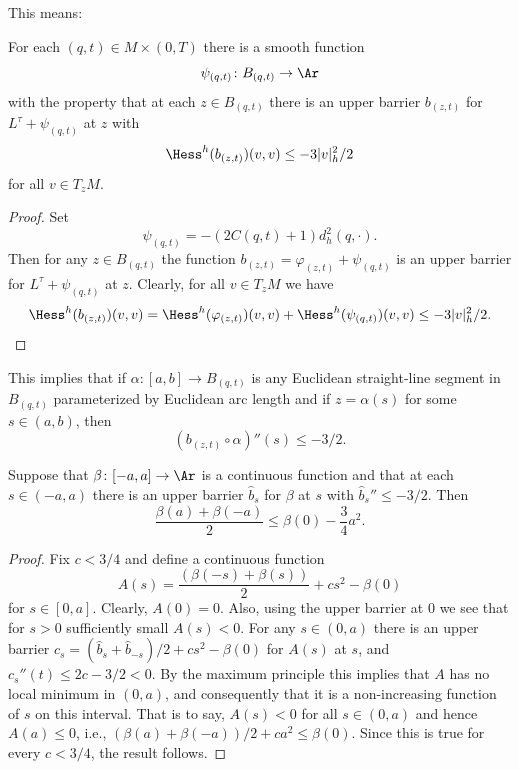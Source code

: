This means:

\begin{claim}
\label{claim:strictly-concave-barrier}
For each $(q,t)\in M\times(0,T)$ there is a smooth function
$$\psi_{(q,t)}\colon B_{(q,t)}\to \Ar$$
 with the property that at each
$z\in B_{(q,t)}$ there is an upper barrier $b_{(z,t)}$ for
$L^\tau+\psi_{(q,t)}$ at $z$ with
$$\Hess^h(b_{(z,t)})(v,v)\le -3|v|_h^2/2$$
for all $v\in T_zM$.
\end{claim}

\begin{proof}\sketch
 Set
$$\psi_{(q,t)}=-(2C(q,t)+1)d^2_h(q,\cdot).$$
Then  for any $z\in B_{(q,t)}$ the function
$b_{(z,t)}=\varphi_{(z,t)}+\psi_{(q,t)}$ is an upper barrier  for
$L^\tau+\psi_{(q,t)}$ at $z$. Clearly, for all $v\in T_zM$ we have
$$\Hess^h(b_{(z,t)})(v,v)=\Hess^h(\varphi_{(z,t)})(v,v)+\Hess^h(\psi_{(q,t)})(v,v)\le -3|v|_h^2/2.$$
\end{proof}

This implies that if $\alpha\colon [a,b]\to B_{(q,t)}$ is any
Euclidean straight-line segment in $B_{(q,t)}$ parameterized by
Euclidean arc length and if $z= \alpha(s)$ for some $s\in (a,b)$,
then
$$(b_{(z,t)}\circ\alpha)''(s)\le -3/2.$$


\begin{claim}
\label{claim:one-dim-barrier-maximum-principle}
Suppose that $\beta\colon [-a,a]\to \Ar$ is a continuous function
and that at each $s\in (-a,a)$ there is an upper barrier $\hat b_s$
for $\beta$  at $s$ with $\hat b_s''\le -3/2$. Then
$$\frac{\beta(a)+\beta(-a)}{2}\le \beta(0)-\frac{3}{4}a^2.$$
\end{claim}

\begin{proof}\sketch
Fix $c<3/4$ and define a continuous function
$$A(s)=\frac{(\beta(-s)+\beta(s))}{2}+cs^2-\beta(0)$$ for $s\in [0,a]$.
Clearly, $A(0)=0$. Also, using the upper barrier at $0$ we see that
for $s>0$ sufficiently small $A(s)<0$. For any $s\in (0,a)$ there is
an upper barrier $c_s=(\hat b_{s}+\hat b_{-s})/2+cs^2-\beta(0)$ for
$A(s)$ at $s$, and $c_s''(t)\le 2c-3/2<0$. By the maximum principle
this implies that $A$ has no local minimum in $(0,a)$, and
consequently that it is a non-increasing function of $s$ on this
interval. That is to say, $A(s)<0$ for all $s\in (0,a)$ and hence
$A(a)\le 0$, i.e., $(\beta(a)+\beta(-a))/2+ca^2\le \beta(0)$. Since
this is true for every $c<3/4$, the result follows.
\end{proof}

